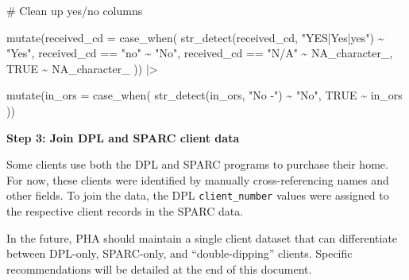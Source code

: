 \documentclass[
  letterpaper,
  DIV=11,
  numbers=noendperiod]{scrartcl}
\newenvironment{Shaded}{\begin{snugshade}}{\end{snugshade}}
\newcommand{\AttributeTok}[1]{\textcolor[rgb]{0.40,0.45,0.13}{#1}}
\newcommand{\CommentTok}[1]{\textcolor[rgb]{0.37,0.37,0.37}{#1}}
\newcommand{\ConstantTok}[1]{\textcolor[rgb]{0.56,0.35,0.01}{#1}}
\newcommand{\FunctionTok}[1]{\textcolor[rgb]{0.28,0.35,0.67}{#1}}
\newcommand{\NormalTok}[1]{\textcolor[rgb]{0.00,0.23,0.31}{#1}}
\newcommand{\SpecialCharTok}[1]{\textcolor[rgb]{0.37,0.37,0.37}{#1}}
\newcommand{\StringTok}[1]{\textcolor[rgb]{0.13,0.47,0.30}{#1}}
\begin{document}
\begin{Shaded}
\begin{Highlighting}[]
  \CommentTok{\# Clean up yes/no columns}
  
  \FunctionTok{mutate}\NormalTok{(}\AttributeTok{received\_cd =} \FunctionTok{case\_when}\NormalTok{(}
    \FunctionTok{str\_detect}\NormalTok{(received\_cd, }\StringTok{"YES|Yes|yes"}\NormalTok{) }\SpecialCharTok{\textasciitilde{}} \StringTok{"Yes"}\NormalTok{,}
\NormalTok{    received\_cd }\SpecialCharTok{==} \StringTok{"no"} \SpecialCharTok{\textasciitilde{}} \StringTok{"No"}\NormalTok{,}
\NormalTok{    received\_cd }\SpecialCharTok{==} \StringTok{"N/A"} \SpecialCharTok{\textasciitilde{}} \ConstantTok{NA\_character\_}\NormalTok{,}
    \ConstantTok{TRUE} \SpecialCharTok{\textasciitilde{}} \ConstantTok{NA\_character\_}
\NormalTok{  )) }\SpecialCharTok{|\textgreater{}} 
  
  \FunctionTok{mutate}\NormalTok{(}\AttributeTok{in\_ors =} \FunctionTok{case\_when}\NormalTok{(}
    \FunctionTok{str\_detect}\NormalTok{(in\_ors, }\StringTok{"No {-}"}\NormalTok{) }\SpecialCharTok{\textasciitilde{}} \StringTok{"No"}\NormalTok{,}
    \ConstantTok{TRUE} \SpecialCharTok{\textasciitilde{}}\NormalTok{ in\_ors}
\NormalTok{  ))}
\end{Highlighting}
\end{Shaded}

\textbf{Step 3: Join DPL and SPARC client data}

Some clients use both the DPL and SPARC programs to purchase their home.
For now, these clients were identified by manually cross-referencing
names and other fields. To join the data, the DPL
\texttt{client\_number} values were assigned to the respective client
records in the SPARC data.

In the future, PHA should maintain a single client dataset that can
differentiate between DPL-only, SPARC-only, and ``double-dipping''
clients. Specific recommendations will be detailed at the end of this
document.
\end{document}
